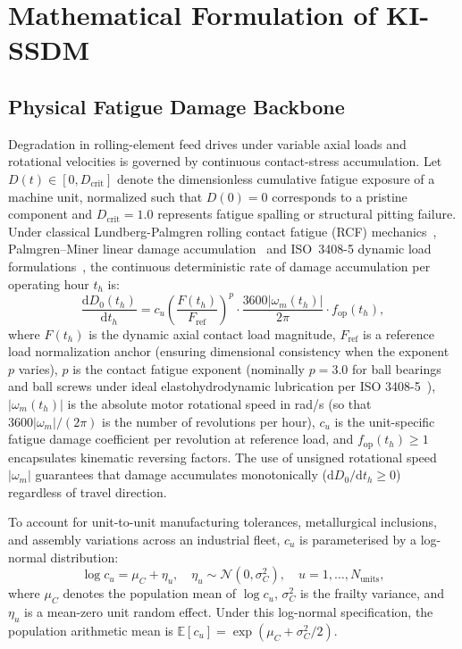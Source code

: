 \documentclass[a4paper,fleqn]{cas-dc}
\newcommand{\Dcrit}{D_{\mathrm{crit}}}
\begin{document}
\section{Mathematical Formulation of KI-SSDM}
\label{sec:methodology}

\subsection{Physical Fatigue Damage Backbone}
\label{subsec:physics_backbone}

Degradation in rolling-element feed drives under variable axial loads and rotational velocities is governed by continuous contact-stress accumulation. Let $D(t) \in [0, \Dcrit]$ denote the dimensionless cumulative fatigue exposure of a machine unit, normalized such that $D(0) = 0$ corresponds to a pristine component and $\Dcrit = 1.0$ represents fatigue spalling or structural pitting failure. Under classical Lundberg-Palmgren rolling contact fatigue (RCF) mechanics~\cite{Lundberg_1947}, Palmgren--Miner linear damage accumulation~\cite{Miner_1945} and ISO~3408-5 dynamic load formulations~\cite{ISO_3408_5, PMI_Catalog}, the continuous deterministic rate of damage accumulation per operating hour $t_h$ is:
\begin{equation}
    \frac{\mathrm{d}D_0(t_h)}{\mathrm{d}t_h} = c_u \left(\frac{F(t_h)}{F_{\mathrm{ref}}}\right)^p \cdot \frac{3600 |\omega_m(t_h)|}{2\pi} \cdot f_{\mathrm{op}}(t_h),
    \label{eq:miner_damage}
\end{equation}
where $F(t_h)$ is the dynamic axial contact load magnitude, $F_{\mathrm{ref}}$ is a reference load normalization anchor (ensuring dimensional consistency when the exponent $p$ varies), $p$ is the contact fatigue exponent (nominally $p=3.0$ for ball bearings and ball screws under ideal elastohydrodynamic lubrication per ISO 3408-5~\cite{ISO_3408_5}), $|\omega_m(t_h)|$ is the absolute motor rotational speed in rad/s (so that $3600|\omega_m|/(2\pi)$ is the number of revolutions per hour), $c_u$ is the unit-specific fatigue damage coefficient per revolution at reference load, and $f_{\mathrm{op}}(t_h) \ge 1$ encapsulates kinematic reversing factors. The use of unsigned rotational speed $|\omega_m|$ guarantees that damage accumulates monotonically ($\mathrm{d}D_0 / \mathrm{d}t_h \ge 0$) regardless of travel direction.

To account for unit-to-unit manufacturing tolerances, metallurgical inclusions, and assembly variations across an industrial fleet, $c_u$ is parameterised by a log-normal distribution:
\begin{equation}
    \log c_u = \mu_C + \eta_u, \quad \eta_u \sim \mathcal{N}(0, \sigma_C^2), \quad u = 1, \dots, N_{\mathrm{units}},
    \label{eq:unit_frailty}
\end{equation}
where $\mu_C$ denotes the population mean of $\log c_u$, $\sigma_C^2$ is the frailty variance, and $\eta_u$ is a mean-zero unit random effect. Under this log-normal specification, the population arithmetic mean is $\mathbb{E}[c_u] = \exp(\mu_C + \sigma_C^2 / 2)$.
\end{document}
